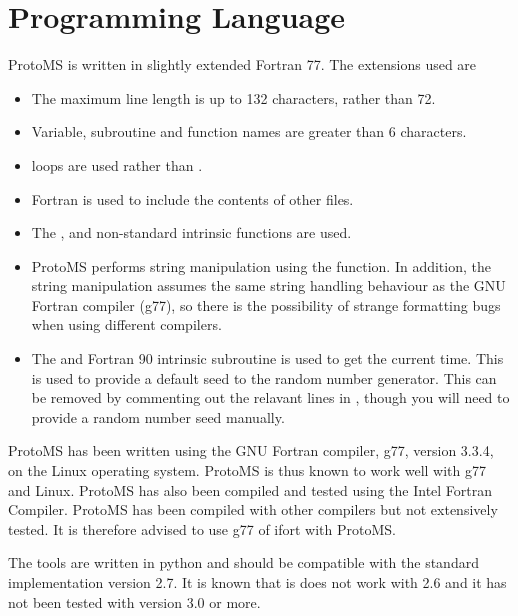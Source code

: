 \documentclass[letterpaper,10pt,english]{sphinxmanual}
\begin{document}
\section{Programming Language}
\label{compilation:fortran77}\label{compilation:programming-language}
ProtoMS is written in slightly extended Fortran 77. The extensions used are
\begin{itemize}
\item {} 
The maximum line length is up to 132 characters, rather than 72.

\item {} 
Variable, subroutine and function names are greater than 6 characters.

\item {} 
 loops are used rather than .

\item {} 
Fortran  is used to include the contents of other files.

\item {} 
The ,  and  non-standard intrinsic functions are used.

\item {} 
ProtoMS performs string manipulation using the  function. In addition, the string manipulation assumes the same string handling behaviour as the GNU Fortran compiler (g77), so there is the possibility of strange formatting bugs when using different compilers.

\item {} 
The  and  Fortran 90 intrinsic subroutine is used to get the current time. This is used to provide a default seed to the random number generator. This can be removed by commenting out the relavant lines in , though you will need to provide a random number seed manually.

\end{itemize}

ProtoMS has been written using the GNU Fortran compiler, g77, version 3.3.4, on the Linux operating system. ProtoMS is thus known to work well with g77 and Linux. ProtoMS has also been compiled and tested using the Intel Fortran Compiler. ProtoMS has been compiled with other compilers but not extensively tested. It is therefore advised to use g77 of ifort with ProtoMS.

The tools are written in python and should be compatible with the standard implementation version 2.7. It is known that is does not work with 2.6 and it has not been tested with version 3.0 or more.
\end{document}
